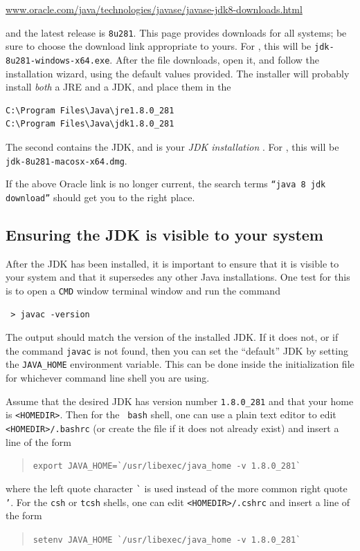 \href{https://www.oracle.com/java/technologies/javase/javase-jdk8-downloads.html}%
{www.oracle.com/java/technologies/javase/javase-jdk8-downloads.html}

and the latest release is {\tt 8u281}. This page provides downloads
for all systems; be sure to choose the download link appropriate to
yours. 
\ifWindows
For \SYSTEM{}, this will be {\tt jdk-8u281-windows-x64.exe}.  After
the file downloads, open it, and follow the installation wizard, using
the default values provided. The installer will probably install {\it
both} a JRE and a JDK, and place them in the \directories{}
\begin{verbatim}
C:\Program Files\Java\jre1.8.0_281
C:\Program Files\Java\jdk1.8.0_281
\end{verbatim}
The second contains the JDK, and is your {\it JDK installation} \directory{}.
\fi
\ifMacOS
For \SYSTEM{}, this will be {\tt jdk-8u281-macosx-x64.dmg}.
\fi

If the above Oracle link is no longer current, the search terms
{\tt ``java 8 jdk download''} should get you to the right place.

\subsection{Ensuring the JDK is visible to your system}
\label{MakingJDKVisible}

After the JDK has been installed, it is important to ensure that it is
visible to your system and that it supersedes any other Java
installations. One test for this is to open a
\ifWindows
{\tt CMD} window
\else
terminal window
\fi
and run the command 
\begin{verbatim}
 > javac -version
\end{verbatim}
The output should match the version of the installed JDK. If it does
not, or if the command {\tt javac} is not found,
\ifMacOS %
then you can set the ``default'' JDK by setting the {\tt JAVA\_HOME}
environment variable.  This can be done inside the
initialization file for whichever command line shell you are using.

Assume that the desired JDK has version number {\tt 1.8.0\_281} and
that your home \directory{} is {\tt <HOMEDIR>}.  Then for the {\tt
bash} shell, one can use a plain text editor to edit {\tt
<HOMEDIR>/.bashrc} (or create the file if it does not already exist)
and insert a line of the form
\begin{quote}
  {\tt export JAVA\_HOME=\`{}/usr/libexec/java\_home -v 1.8.0\_281\`{}}
\end{quote}
where the left quote character {\tt \`{}} is used instead of the more
common right quote {\tt '}. For the {\tt csh} or {\tt tcsh} shells,
one can edit {\tt <HOMEDIR>/.cshrc} and insert a line of the form
\begin{quote}
  {\tt setenv JAVA\_HOME \`{}/usr/libexec/java\_home -v 1.8.0\_281\`{}}
\end{quote}

